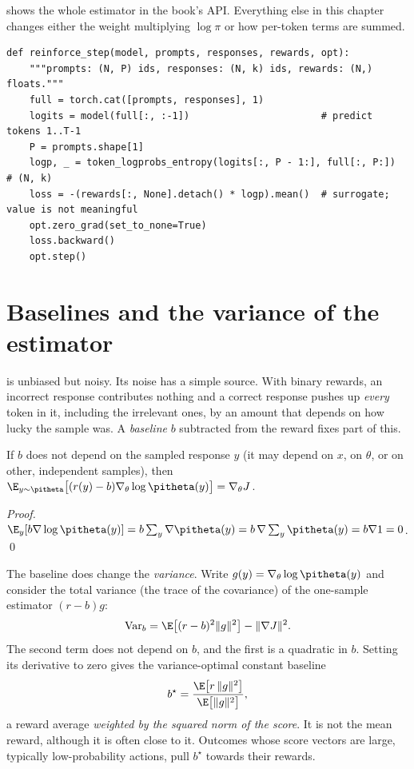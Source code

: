  shows the whole estimator in the book's API. Everything else in this
chapter changes either the weight multiplying $\log\pi$ or how per-token terms are summed.

\begin{lstlisting}[caption={The REINFORCE surrogate for a batch of fixed-length responses (from \code{llmsys.pg}).},label={lst:pg:surrogate}]
def reinforce_step(model, prompts, responses, rewards, opt):
    """prompts: (N, P) ids, responses: (N, k) ids, rewards: (N,) floats."""
    full = torch.cat([prompts, responses], 1)
    logits = model(full[:, :-1])                       # predict tokens 1..T-1
    P = prompts.shape[1]
    logp, _ = token_logprobs_entropy(logits[:, P - 1:], full[:, P:])   # (N, k)
    loss = -(rewards[:, None].detach() * logp).mean()  # surrogate; value is not meaningful
    opt.zero_grad(set_to_none=True)
    loss.backward()
    opt.step()
\end{lstlisting}

\section{Baselines and the variance of the estimator}\label{sec:pg:baselines}

 is unbiased but noisy. Its noise has a simple source. With binary
rewards, an incorrect response contributes nothing and a correct response pushes up
\emph{every} token in it, including the irrelevant ones, by an amount that depends on how
lucky the sample was. A \emph{baseline} $b$ subtracted from the reward fixes part of this.

\begin{proposition}\label{prop:pg:baseline}
If $b$ does not depend on the sampled response $y$ (it may depend on $x$, on $\theta$, or on
other, independent samples), then
$\E_{y\sim\pitheta}\big[(r(y)-b)\nabla_\theta\log\pitheta(y)\big]=\nabla_\theta J$.
\end{proposition}
\emph{Proof.} $\E_y[b\nabla\log\pitheta(y)]=b\sum_y\nabla\pitheta(y)=b\,\nabla\sum_y\pitheta(y)=b\nabla1=0$. \qed

The baseline does change the \emph{variance}. Write $g(y)=\nabla_\theta\log\pitheta(y)$ and
consider the total variance (the trace of the covariance) of the one-sample estimator
$(r-b)g$:
\begin{equation}
\operatorname{Var}_b=\E\big[(r-b)^2\|g\|^2\big]-\|\nabla J\|^2 .
\end{equation}
The second term does not depend on $b$, and the first is a quadratic in $b$. Setting its
derivative to zero gives the variance-optimal constant baseline
\begin{equation}
b^\star=\frac{\E\big[r\,\|g\|^2\big]}{\E\big[\|g\|^2\big]},
\label{eq:pg:bstar}
\end{equation}
a reward average \emph{weighted by the squared norm of the score}. It is not the mean reward,
although it is often close to it. Outcomes whose score vectors are large, typically
low-probability actions, pull $b^\star$ towards their rewards.

